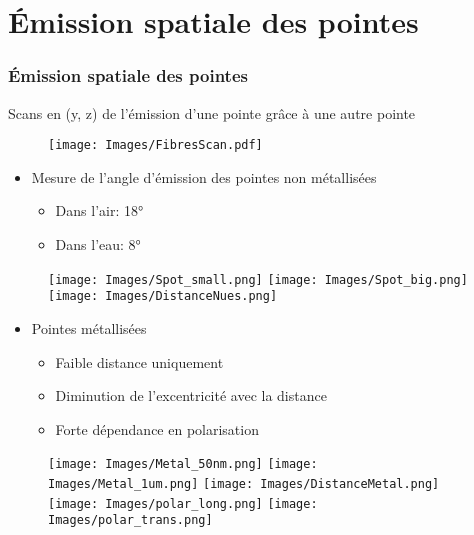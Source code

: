 \documentclass[9pt,a9paper,handout]{beamer}
\begin{document}
\section{Émission spatiale des pointes}
\begin{frame}
    \frametitle{Émission spatiale des pointes}
    Scans en (y, z) de l'émission d'une pointe grâce à une autre pointe
    \begin{figure}[c]\centering
        \texttt{[image: Images/FibresScan.pdf]}
    \end{figure}
    \vspace*{3mm}
    \begin{itemize}
        \item Mesure de l'angle d'émission des pointes non métallisées
        \begin{itemize}
            \item Dans l'air: 18\si{\degree}
            \item Dans l'eau: 8\si{\degree}
        \end{itemize}
    \end{itemize}
    \vspace*{-8mm}
    \begin{figure}[c]\centering\hspace*{35mm}
        \texttt{[image: Images/Spot\_small.png]}
        \quad
        \texttt{[image: Images/Spot\_big.png]}
        \quad
        \texttt{[image: Images/DistanceNues.png]}
    \end{figure}
    
    \begin{itemize}
        \item Pointes métallisées
        \begin{itemize}
            \item Faible distance uniquement
            \item Diminution de l'excentricité avec la distance
            \item Forte dépendance en polarisation
        \end{itemize}
    \end{itemize}


    \begin{figure}[c]\centering
        \texttt{[image: Images/Metal\_50nm.png]}
        \quad
        \texttt{[image: Images/Metal\_1um.png]}
        \quad
        \texttt{[image: Images/DistanceMetal.png]}
        \qquad
        \texttt{[image: Images/polar\_long.png]}
        \quad
        \texttt{[image: Images/polar\_trans.png]}
    \end{figure}

\end{frame}
\end{document}
